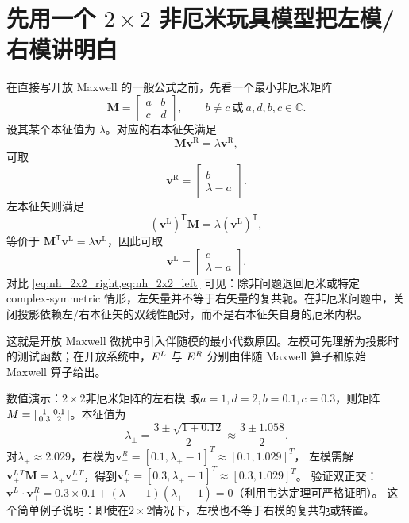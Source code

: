\section{先用一个 \texorpdfstring{$2\times2$}{2x2} 非厄米玩具模型把左模/右模讲明白}
在直接写开放 Maxwell 的一般公式之前，先看一个最小非厄米矩阵
\begin{equation}
\mathbf{M}=
\begin{bmatrix}
a & b\\
c & d
\end{bmatrix},
\qquad b\neq c\ \text{或}\ a,d,b,c\in\mathbb{C}.
\label{eq:nh_2x2_matrix}
\end{equation}
设其某个本征值为 $\lambda$。对应的右本征矢满足
\[
\mathbf M \bm v^{\mathrm R}=\lambda \bm v^{\mathrm R},
\]
可取
\begin{equation}
\bm v^{\mathrm R}=
\begin{bmatrix}
b\\
\lambda-a
\end{bmatrix}.
\label{eq:nh_2x2_right}
\end{equation}
左本征矢则满足
\[
(\bm v^{\mathrm L})^{\mathsf T}\mathbf M=\lambda (\bm v^{\mathrm L})^{\mathsf T},
\]
等价于 $\mathbf M^{\mathsf T}\bm v^{\mathrm L}=\lambda \bm v^{\mathrm L}$，因此可取
\begin{equation}
\bm v^{\mathrm L}=
\begin{bmatrix}
c\\
\lambda-a
\end{bmatrix}.
\label{eq:nh_2x2_left}
\end{equation}
对比 \cref{eq:nh_2x2_right,eq:nh_2x2_left} 可见：除非问题退回厄米或特定 complex-symmetric 情形，左矢量并不等于右矢量的复共轭。在非厄米问题中，关闭投影依赖左/右本征矢的双线性配对，而不是右本征矢自身的厄米内积。

这就是开放 Maxwell 微扰中引入伴随模的最小代数原因。左模可先理解为投影时的测试函数；在开放系统中，$\E^{\mathrm L}$ 与 $\E^{\mathrm R}$ 分别由伴随 Maxwell 算子和原始 Maxwell 算子给出。
\begin{ExampleBox}{数值演示：$2\times2$非厄米矩阵的左右模}
取$a=1, d=2, b=0.1, c=0.3$，则矩阵$\mathbf{M}=\begin{bsmallmatrix}1&0.1\\0.3&2\end{bsmallmatrix}$。本征值为
\[
\lambda_\pm = \frac{3\pm\sqrt{1+0.12}}{2} \approx \frac{3\pm1.058}{2}.
\]
对$\lambda_+ \approx 2.029$，右模为$\bm{v}_+^R=[0.1,\lambda_+-1]^T \approx [0.1,1.029]^T$，
左模需解$\bm{v}_+^L{}^T\mathbf{M}=\lambda_+\bm{v}_+^L{}^T$，得到$\bm{v}_+^L=[0.3,\lambda_+-1]^T \approx [0.3,1.029]^T$。
验证双正交：$\bm{v}_-^L{}\cdot\bm{v}_+^R = 0.3\times0.1 + (\lambda_--1)(\lambda_+-1)=0$（利用韦达定理可严格证明）。
这个简单例子说明：即使在$2\times2$情况下，左模也不等于右模的复共轭或转置。
\end{ExampleBox}

